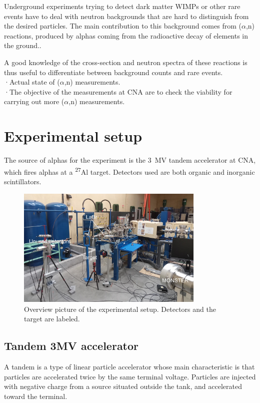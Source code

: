 \documentclass[a4paper,12pt]{report}
\newcommand{\an}{($\alpha$,n) }
\newcommand{\Aliso}{\textsuperscript{27}Al }
\begin{document}
Underground experiments trying to detect dark matter WIMPs or other rare events have to deal with neutron backgrounds that are hard to distinguish from the desired particles.
The main contribution to this background comes from \an reactions, produced by alphas coming from the radioactive decay of elements in the ground.\cite{neutron_in_an}.	%

A good knowledge of the cross-section and neutron spectra of these reactions is thus useful to differentiate between background counts and rare events.
\\

·Actual state of \an measurements.\\

·The objective of the measurements at CNA are to check the viability for carrying out more \an measurements.\\


\chapter{Experimental setup}
The source of alphas for the experiment is the \qty{3}{\mega\volt} tandem accelerator at CNA, which fires alphas at a \Aliso target.
Detectors used are both organic and inorganic scintillators.

\begin{figure}[H]
	\centering
	\includegraphics[width=0.80\textwidth]{overview_photo.jpg}
	\caption{Overview picture of the experimental setup.
	Detectors and the target are labeled.}
	\label{overview_photo}
\end{figure}

\section{Tandem 3MV accelerator}
A tandem is a type of linear particle accelerator whose main characteristic is that particles are accelerated twice by the same terminal voltage.
Particles are injected with negative charge from a source situated outside the tank, and accelerated toward the terminal.
\end{document}
